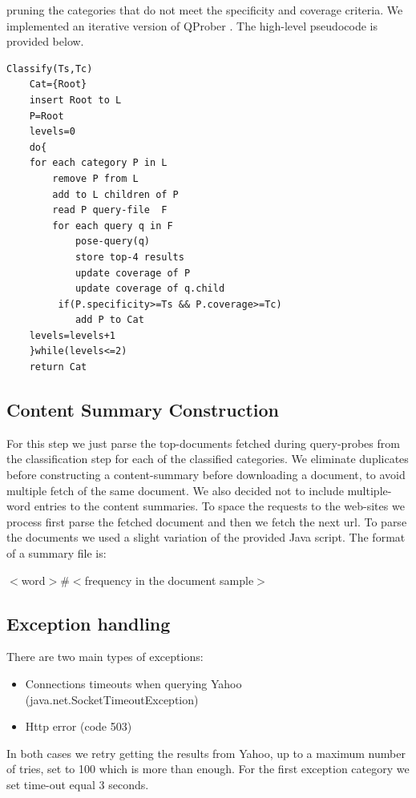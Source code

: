\documentclass[11pt]{article}
\begin{document}
pruning the categories that do not meet the specificity and coverage criteria. We implemented an iterative version of QProber \cite{QProb}. The high-level pseudocode is provided below.

\begin{verbatim}
Classify(Ts,Tc)
    Cat={Root}
    insert Root to L
    P=Root
    levels=0
    do{
    for each category P in L
        remove P from L
        add to L children of P
        read P query-file  F
        for each query q in F
            pose-query(q)
            store top-4 results
            update coverage of P 
            update coverage of q.child
         if(P.specificity>=Ts && P.coverage>=Tc)
            add P to Cat
    levels=levels+1
    }while(levels<=2)
    return Cat
\end{verbatim}

\subsection{Content Summary Construction}
For this step we just parse the top-documents fetched during query-probes from the classification step for each of the classified categories. We eliminate duplicates before constructing 
a content-summary before downloading a document, to avoid multiple fetch of the same document. We also decided not to include multiple-word entries to the content summaries. To space the requests to the web-sites we process first parse the fetched document and then we fetch
the next url. To parse the documents we used a slight variation of the provided Java script. The format of a summary file is:

$<$word$>\#<$frequency in the document sample$>$

\subsection{Exception handling}
There are two main types of exceptions:

\begin{itemize}
\item Connections timeouts when querying Yahoo (java.net.SocketTimeoutException)
\item Http error (code 503)
\end{itemize}

In both cases we retry getting the results from Yahoo, up to a maximum number of tries, set to 100 which is more than enough. For the first exception category we set time-out equal 3 seconds.
\end{document}
